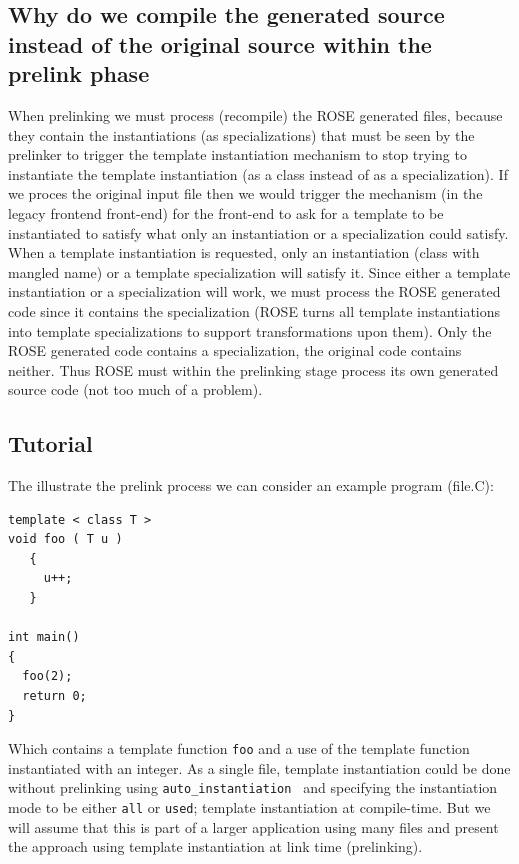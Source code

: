 {\subsection{Why do we compile the generated source instead of the original source within the prelink phase}
   When prelinking we must process (recompile) the ROSE generated files, because they 
contain the instantiations (as specializations) that must be seen by the prelinker to 
trigger the template instantiation mechanism to stop trying to instantiate the template
instantiation (as a class instead of as a specialization).  If we proces the original input file
then we would trigger the mechanism (in the legacy frontend front-end) for the front-end to ask for a template to be
instantiated to satisfy what only an instantiation or a specialization could satisfy.
When a template instantiation is requested, only an instantiation (class with mangled name)
or a template specialization will satisfy it. 
Since either a template instantiation or a specialization will work, we must process
the ROSE generated code since it contains the specialization (ROSE turns all template
instantiations into template specializations to support transformations upon them).
Only the ROSE generated code contains a specialization, the original code contains 
neither.  Thus ROSE must within the prelinking stage process its own generated 
source code (not too much of a problem).

\subsection{Tutorial}

   The illustrate the prelink process we can consider an example program (file.C):

{\indent
{\mySmallFontSize

\begin{verbatim}
template < class T >
void foo ( T u )
   {
     u++;
   }

int main()
{
  foo(2);
  return 0;
}
\end{verbatim}
}}

Which contains a template function {\tt foo} and a use of the template function
instantiated with an integer. As a single file, template instantiation could be done
without prelinking using {\tt auto\_instantiation } and specifying the instantiation
mode to be either {\tt all} or {\tt used}; template instantiation at compile-time.  
But we will assume that this is part of a larger application using many files and 
present the approach using template instantiation at link time (prelinking).


}
